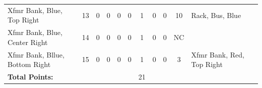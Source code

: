\begin{table}[!htp]
{\begin{tabular}{lcccccccccll}
			Xfmr Bank, Blue, Top Right                          & 13                      & 0                                           & 0                                          & 0           & 0           & 1            & 0                & 0 & 10                           & Rack, Bus, Blue                  &                \\
			Xfmr Bank, Blue, Center Right                       & 14                      & 0                                           & 0                                          & 0           & 0           & 1            & 0                & 0 & NC                           &                                  &                \\
			Xfmr Bank, Bllue, Bottom Right                      & 15                      & 0                                           & 0                                          & 0           & 0           & 1            & 0                & 0 & 3                            & Xfmr Bank, Red, Top Right        &                \\ \bottomrule
			\textbf{Total Points:}                              &                         &                                             &                                            &             &             & 21           &                  &   &                              &                                  &                \\ \bottomrule
		\end{tabular}
	}
\end{table}
